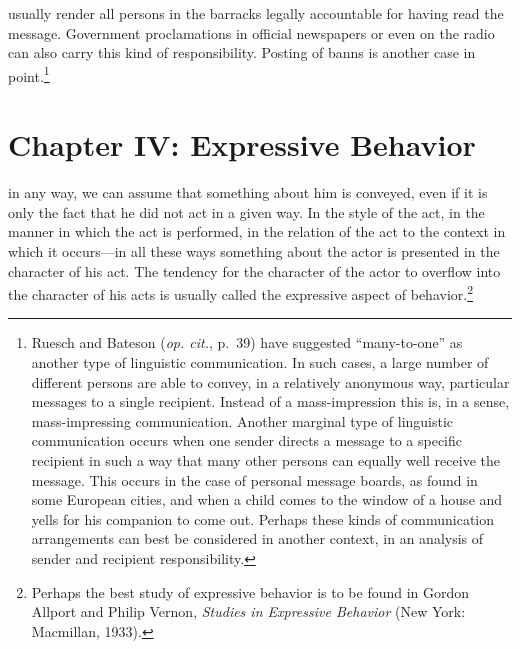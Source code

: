 \documentclass[twoside,symmetric,nobib,justified]{tufte-book}
\let\oldchapter\chapter
\def\chapter{%
  \setcounter{footnote}{0}%
  \oldchapter
}
\begin{document}
usually render all persons in the barracks legally accountable for
having read the message. Government proclamations in official newspapers
or even on the radio can also carry this kind of responsibility. Posting
of banns is another case in point.\footnote{Ruesch and Bateson
  (\emph{op. cit.}, p.~39) have suggested ``many-to-one'' as another
  type of linguistic communication. In such cases, a large number of
  different persons are able to convey, in a relatively anonymous way,
  particular messages to a single recipient. Instead of a
  mass-impression this is, in a sense, mass-impressing communication.
  Another marginal type of linguistic communication occurs when one
  sender directs a message to a specific recipient in such a way that
  many other persons can equally well receive the message. This occurs
  in the case of personal message boards, as found in some European
  cities, and when a child comes to the window of a house and yells for
  his companion to come out. Perhaps these kinds of communication
  arrangements can best be considered in another context, in an analysis
  of sender and recipient responsibility.}


\chapter[CHAPTER IV: EXPRESSIVE BEHAVIOR]{Chapter IV: Expressive Behavior}
\label{ch:Chapter IV: Expressive Behavior}

 in any way, we can assume that something
about him is conveyed, even if it is only the fact that he did not act
in a given way. In the style of the act, in the manner in which the act
is performed, in the relation of the act to the context in which it
occurs---in all these ways something about the actor is presented in the
character of his act. The tendency for the character of the actor to
overflow into the character of his acts is usually called the expressive
aspect of behavior.\footnote{Perhaps the best study of expressive
  behavior is to be found in Gordon Allport and Philip Vernon,
  \emph{Studies in Expressive Behavior} (New York: Macmillan, 1933).}
\end{document}
